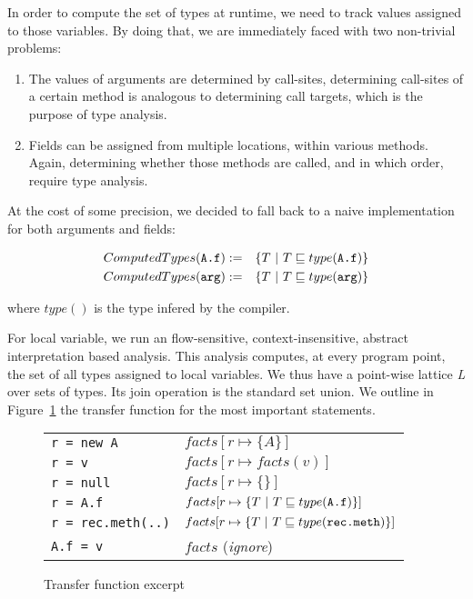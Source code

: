 In order to compute the set of types at runtime, we need to track values
assigned to those variables. By doing that, we are immediately faced with two
non-trivial problems:
\begin{enumerate}
    \item The values of arguments are determined by call-sites, determining
    call-sites of a certain method is analogous to determining call targets,
    which is the purpose of type analysis.

    \item Fields can be assigned from multiple locations, within various
    methods. Again, determining whether those methods are
    called, and in which order, require type analysis.
\end{enumerate}

At the cost of some precision, we decided to fall back to a naive
implementation for both arguments and fields:

\begin{eqnarray*}
    ComputedTypes(\verb/A.f/) &:=& \{ T ~|~ T \subtype type(\verb/A.f/) \} \\
    ComputedTypes(\verb/arg/) &:=& \{ T ~|~ T \subtype type(\verb/arg/) \} \\
\end{eqnarray*}

where $type()$ is the type infered by the compiler.

For local variable, we run an flow-sensitive, context-insensitive, abstract
interpretation based analysis. This analysis computes, at every program point,
the set of all types assigned to local variables. We thus have a point-wise
lattice \emph{L} over sets of types. Its join operation is the standard set
union. We outline in Figure~\ref{fig:ta:tf} the transfer function for the most
important statements.
\FloatBarrier
\begin{figure}[h]
    \centering

    \begin{tabular}{ | l | l | }
        \hline
        \verb/r = new A/          & $facts[ r \mapsto \{ A \}]$ \\
        \verb/r = v/              & $facts[ r \mapsto facts(v)]$ \\
        \verb/r = null/           & $facts[ r \mapsto \{ \}]$ \\
        \verb/r = A.f/            & $facts[ r \mapsto \{ T ~|~ T \subtype type(\verb/A.f/)\}]$ \\
        \verb/r = rec.meth(..)/   & $facts[ r \mapsto \{ T ~|~ T \subtype type(\verb/rec.meth/)\}]$ \\
        \verb/A.f = v/            & $facts$ (\emph{ignore}) \\
        \hline
    \end{tabular}

    \caption{Transfer function excerpt}
    \label{fig:ta:tf}
\end{figure}

